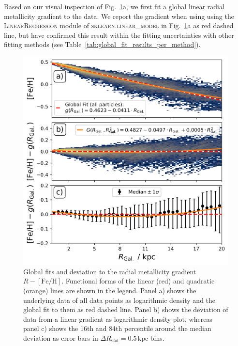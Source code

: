 \documentclass[fleqn,usenatbib]{mnras}
\begin{document}


Based on our visual inspection of Fig.~\ref{fig:global_r_feh_fit}a, we first fit a global linear radial metallicity gradient to the data. We report the gradient when using using the \textsc{LinearRegression} module of \textsc{sklearn.linear\_model} \citep{scikit-learn} in Fig.~\ref{fig:global_r_feh_fit}a as red dashed line, but have confirmed this result within the fitting uncertainties with other fitting methods (see Table~\ref{tab:global_fit_results_per_method}).

\begin{figure}
    \centering
    \includegraphics[width=\columnwidth]{figures/global_r_feh_fit.png}
    \caption{Global fits and deviation to the radial metallicity gradient $R-\mathrm{[Fe/H]}$. Functional forms of the linear (red) and quadratic (orange) lines are shown in the legend. Panel a) shows the underlying data of all data points as logarithmic density and the global fit to them as red dashed line. Panel b) shows the deviation of data from a linear gradient as logarithmic density plot, whereas panel c) shows the 16th and 84th percentile around the median deviation as error bars in $\Delta R_\mathrm{Gal} = 0.5\,\mathrm{kpc}$ bins.}
    \label{fig:global_r_feh_fit}
\end{figure}
\end{document}
